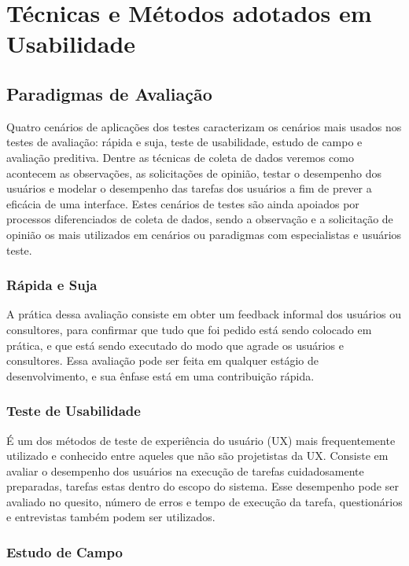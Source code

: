 \chapter{Técnicas e Métodos adotados em Usabilidade}


\section{Paradigmas de Avaliação}

Quatro cenários de aplicações dos testes caracterizam os cenários mais usados nos testes de avaliação: rápida e suja, teste de usabilidade, estudo de campo e avaliação preditiva. Dentre as técnicas de coleta de dados veremos como acontecem as observações, as solicitações de opinião, testar o desempenho dos usuários e modelar o desempenho das tarefas dos usuários a fim de prever a eficácia de uma interface. Estes cenários de testes são ainda apoiados por processos diferenciados de coleta de dados, sendo a observação e a solicitação de opinião os mais utilizados em cenários ou paradigmas com especialistas e usuários teste.

\subsection{Rápida e Suja}

A prática dessa avaliação consiste em obter um feedback informal dos usuários ou consultores, para confirmar que tudo que foi pedido está sendo colocado em prática, e que está sendo executado do modo que agrade os usuários e consultores. Essa avaliação pode ser feita em qualquer estágio de desenvolvimento, e sua ênfase está em uma contribuição rápida.

\subsection{Teste de Usabilidade}

É um dos métodos de teste de experiência do usuário (UX) mais frequentemente utilizado e conhecido entre aqueles que não são projetistas da UX.
Consiste em avaliar o desempenho dos usuários na execução de tarefas cuidadosamente preparadas, tarefas estas dentro do escopo do sistema. Esse desempenho pode ser avaliado no quesito, número de erros e tempo de execução da tarefa, questionários e entrevistas também podem ser utilizados.


\subsection{Estudo de Campo}

